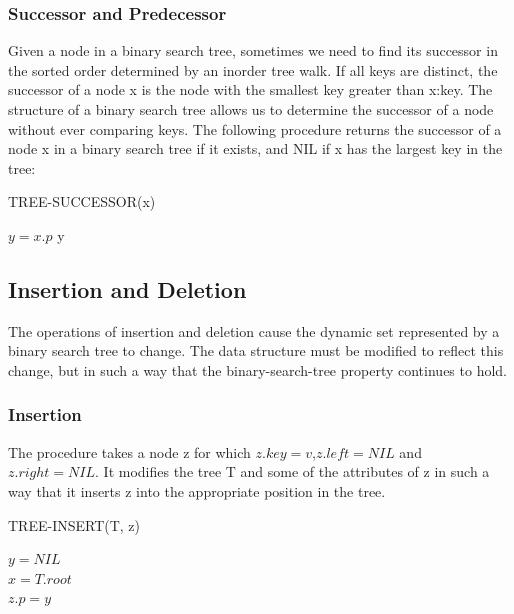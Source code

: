 \subsubsection*{Successor and Predecessor}

Given a node in a binary search tree, sometimes we need to find its successor in
the sorted order determined by an inorder tree walk. If all keys are distinct, the
successor of a node x is the node with the smallest key greater than x:key. The
structure of a binary search tree allows us to determine the successor of a node
without ever comparing keys. The following procedure returns the successor of a
node x in a binary search tree if it exists, and NIL if x has the largest key in the
tree:

\begin{algorithm}
    \caption{TREE-SUCCESSOR(x)}
    $y = x.p$
    \Return y
\end{algorithm}

\subsection{Insertion and Deletion}

The operations of insertion and deletion cause the dynamic set represented by a
binary search tree to change. The data structure must be modified to reflect this
change, but in such a way that the binary-search-tree property continues to hold.

\subsubsection*{Insertion}

The procedure takes a node z for which $z.key = v$,$ z.left = NIL$ and $z.right = NIL$. 
It modifies the tree T and some of the attributes of z in such a way that it inserts
z into the appropriate position in the tree.

\begin{algorithm}
    \caption{TREE-INSERT(T, z)}
    $y = NIL$\\
    $x = T.root$\\
    $z.p = y$\\
\end{algorithm}

